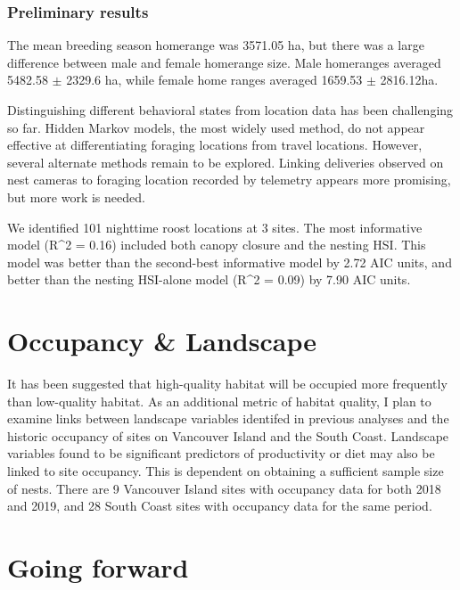 \documentclass[]{article}
\begin{document}
\subsubsection{Preliminary results}\label{preliminary-results-2}

The mean breeding season homerange was 3571.05 ha, but there was a large
difference between male and female homerange size. Male homeranges
averaged 5482.58 \(\pm\) 2329.6 ha, while female home ranges averaged
1659.53 \(\pm\) 2816.12ha.

Distinguishing different behavioral states from location data has been
challenging so far. Hidden Markov models, the most widely used method,
do not appear effective at differentiating foraging locations from
travel locations. However, several alternate methods remain to be
explored. Linking deliveries observed on nest cameras to foraging
location recorded by telemetry appears more promising, but more work is
needed.

We identified 101 nighttime roost locations at 3 sites. The most
informative model (R\^{}2 = 0.16) included both canopy closure and the
nesting HSI. This model was better than the second-best informative
model by 2.72 AIC units, and better than the nesting HSI-alone model
(R\^{}2 = 0.09) by 7.90 AIC units.

\section{Occupancy \& Landscape}\label{occupancy-landscape}

It has been suggested that high-quality habitat will be occupied more
frequently than low-quality habitat. As an additional metric of habitat
quality, I plan to examine links between landscape variables identifed
in previous analyses and the historic occupancy of sites on Vancouver
Island and the South Coast. Landscape variables found to be significant
predictors of productivity or diet may also be linked to site occupancy.
This is dependent on obtaining a sufficient sample size of nests. There
are 9 Vancouver Island sites with occupancy data for both 2018 and 2019,
and 28 South Coast sites with occupancy data for the same period.

\section{Going forward}\label{going-forward}
\end{document}
